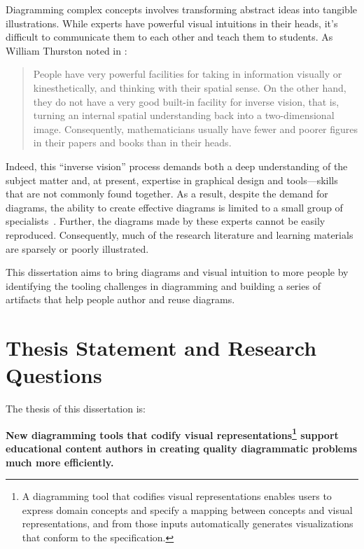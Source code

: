 Diagramming complex concepts involves transforming abstract ideas into tangible illustrations. While experts have powerful visual intuitions in their heads, it's difficult to communicate them to each other and teach them to students. As William Thurston noted in :

\begin{quote}
   People have very powerful facilities for taking in information visually or kinesthetically, and thinking with their spatial sense. On the other hand, they do not have a very good built-in facility for inverse vision, that is, turning an internal spatial understanding back into a two-dimensional image. Consequently, mathematicians usually have fewer and poorer figures in their papers and books than in their heads.~\cite[p. 164]{thurston_proof_1994}
\end{quote}

\noindent
Indeed, this ``inverse vision'' process demands both a deep understanding of the subject matter and, at present, expertise in graphical design and tools---skills that are not commonly found together. As a result, despite the demand for diagrams, the ability to create effective diagrams is limited to a small group of specialists~\cite{coulon_importance_2024}. Further, the diagrams made by these experts cannot be easily reproduced. Consequently, much of the research literature and learning materials are sparsely or poorly illustrated.

This dissertation aims to bring diagrams and visual intuition to more people by identifying the tooling challenges in diagramming and building a series of artifacts that help people author and reuse diagrams. 

\section{Thesis Statement and Research Questions}

The thesis of this dissertation is:


\vspace{1em}
\begin{mdframed}
\begin{center} 
\parbox{0.95\linewidth}{ 
\renewcommand{\thempfootnote}{\fnsymbol{footnote}}
\textbf{New diagramming tools that codify visual representations\footnote{A diagramming tool that codifies visual representations enables users to express domain concepts and specify a mapping between concepts and visual representations, and from those inputs automatically generates visualizations that conform to the specification.} support educational content authors in creating quality diagrammatic problems much more efficiently.}
}
\end{center}
\end{mdframed}
\vspace{1em}

